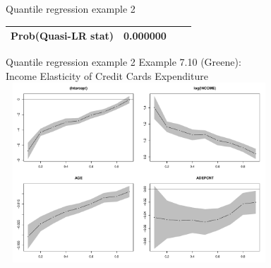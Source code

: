 \documentclass{beamer}
\begin{document}
\begin{frame}{Quantile regression example 2}
\begin{table}[]
\begin{tabular}{@{}lllll@{}}
Prob(Quasi-LR stat)                                                                                    & 0.000000                                                                                 & \multicolumn{2}{l}{}                                                                                                                                                              &                                                                                   \\ \bottomrule
\end{tabular}
\end{table}
\end{frame}
\begin{frame}{Quantile regression example 2}
Example 7.10 (Greene): \\Income Elasticity of Credit Cards Expenditure\\
\includegraphics[width=10cm, height=6.7cm]{img/quantil_regression.pdf}
\end{frame}
\end{document}
